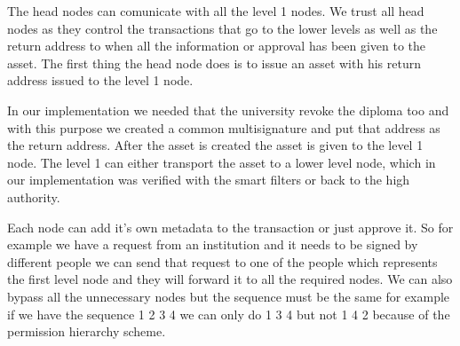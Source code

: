 \documentclass[conference]{IEEEtran}
\begin{document}
The head nodes can comunicate with all the level 1 nodes. We trust all head nodes as they control the transactions that go to the lower levels as well as the return address to when all the information or approval has been given to the asset. The first thing the head node does is to issue an asset with his return address issued to the level 1 node.\par In our implementation we needed that the university revoke the diploma too and with this purpose we created a common multisignature and put that address as the return address. After the asset is created the asset is given to the level 1 node. The level 1 can either transport the asset to a lower level node, which in our implementation was verified with the smart filters or back to the high authority.\par Each node can add it's own metadata to the transaction or just approve it. So for example we have a request from an institution and it needs to be signed by different people we can send that request to one of the people which represents the first level node and they will forward it to all the required nodes. We can also bypass all the unnecessary nodes but the sequence must be the same for example if we have the sequence 1 2 3 4 we can only do 1 3 4 but not 1 4 2 because of the permission hierarchy scheme.


\end{document}
